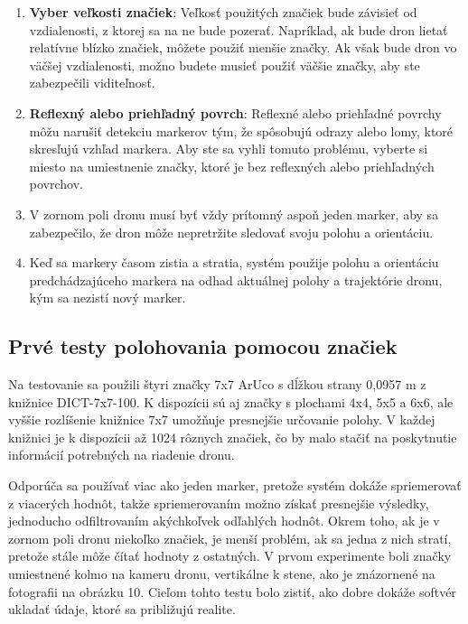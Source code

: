 {\begin{enumerate}
\item \textbf{Vyber veľkosti značiek}: Veľkosť použitých značiek bude závisieť od vzdialenosti, z ktorej sa na ne bude pozerať. Napríklad, ak bude dron lietať relatívne blízko značiek, môžete použiť menšie značky. Ak však bude dron vo väčšej vzdialenosti, možno budete musieť použiť väčšie značky, aby ste zabezpečili viditeľnosť.

\item \textbf{Reflexný alebo priehľadný povrch}: Reflexné alebo priehľadné povrchy môžu narušiť detekciu markerov tým, že spôsobujú odrazy alebo lomy, ktoré skresľujú vzhľad markera. Aby ste sa vyhli tomuto problému, vyberte si miesto na umiestnenie značky, ktoré je bez reflexných alebo priehľadných povrchov.

\item V zornom poli dronu musí byť vždy prítomný aspoň jeden marker, aby sa zabezpečilo, že dron môže nepretržite sledovať svoju polohu a orientáciu.

\item Keď sa markery časom zistia a stratia, systém použije polohu a orientáciu predchádzajúceho markera na odhad aktuálnej polohy a trajektórie dronu, kým sa nezistí nový marker.
\end{enumerate}


\subsection{Prvé testy polohovania pomocou značiek}
Na testovanie sa použili štyri značky 7x7 ArUco s dĺžkou strany 0,0957 m z knižnice DICT-7x7-100. K dispozícii sú aj značky s plochami 4x4, 5x5 a 6x6, ale vyššie rozlíšenie knižnice 7x7 umožňuje presnejšie určovanie polohy. V každej knižnici je k dispozícii až 1024 rôznych značiek, čo by malo stačiť na poskytnutie informácií potrebných na riadenie dronu.

Odporúča sa používať viac ako jeden marker, pretože systém dokáže spriemerovať z viacerých hodnôt, takže spriemerovaním možno získať presnejšie výsledky, jednoducho odfiltrovaním akýchkoľvek odľahlých hodnôt. Okrem toho, ak je v zornom poli dronu niekoľko značiek, je menší problém, ak sa jedna z nich stratí, pretože stále môže čítať hodnoty z ostatných. V prvom experimente boli značky umiestnené kolmo na kameru dronu, vertikálne k stene, ako je znázornené na fotografii na obrázku 10. Cieľom tohto testu bolo zistiť, ako dobre dokáže softvér ukladať údaje, ktoré sa približujú realite.

}
